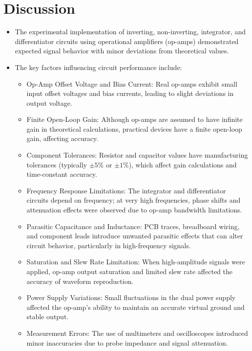 \documentclass[9pt,conference]{IEEEtran}
\begin{document}
\section{Discussion}
\begin{itemize}
    \item The experimental implementation of inverting, non-inverting, integrator, and differentiator circuits using operational amplifiers (op-amps) demonstrated expected signal behavior with minor deviations from theoretical values.
    \item The key factors influencing circuit performance include:
    \begin{itemize}
        \item Op-Amp Offset Voltage and Bias Current: Real op-amps exhibit small input offset voltages and bias currents, leading to slight deviations in output voltage.
        \item Finite Open-Loop Gain: Although op-amps are assumed to have infinite gain in theoretical calculations, practical devices have a finite open-loop gain, affecting accuracy.
        \item Component Tolerances: Resistor and capacitor values have manufacturing tolerances (typically \(\pm 5\%\) or \(\pm 1\%\)), which affect gain calculations and time-constant accuracy.
        \item Frequency Response Limitations: The integrator and differentiator circuits depend on frequency; at very high frequencies, phase shifts and attenuation effects were observed due to op-amp bandwidth limitations.
        \item Parasitic Capacitance and Inductance: PCB traces, breadboard wiring, and component leads introduce unwanted parasitic effects that can alter circuit behavior, particularly in high-frequency signals.
        \item Saturation and Slew Rate Limitation: When high-amplitude signals were applied, op-amp output saturation and limited slew rate affected the accuracy of waveform reproduction.
        \item Power Supply Variations: Small fluctuations in the dual power supply affected the op-amp’s ability to maintain an accurate virtual ground and stable output.
        \item Measurement Errors: The use of multimeters and oscilloscopes introduced minor inaccuracies due to probe impedance and signal attenuation.
    \end{itemize}
\end{itemize}
\end{document}
